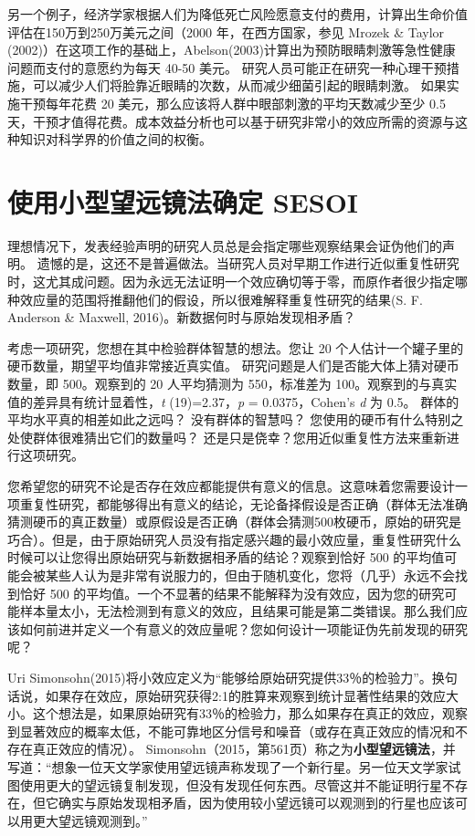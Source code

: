 \documentclass[
  letterpaper,
  DIV=11,
  numbers=noendperiod]{scrreprt}
\begin{document}
另一个例子，经济学家根据人们为降低死亡风险愿意支付的费用，计算出生命价值评估在150万到250万美元之间（2000
年，在西方国家，参见 Mrozek \& Taylor
(2002)）在这项工作的基础上，Abelson(2003)计算出为预防眼睛刺激等急性健康问题而支付的意愿约为每天
40-50 美元。
研究人员可能正在研究一种心理干预措施，可以减少人们将脸靠近眼睛的次数，从而减少细菌引起的眼睛刺激。
如果实施干预每年花费 20 美元，那么应该将人群中眼部刺激的平均天数减少至少
0.5
天，干预才值得花费。成本效益分析也可以基于研究非常小的效应所需的资源与这种知识对科学界的价值之间的权衡。

\hypertarget{ux4f7fux7528ux5c0fux578bux671bux8fdcux955cux6cd5ux786eux5b9a-sesoi}{%
\section{使用小型望远镜法确定
SESOI}\label{ux4f7fux7528ux5c0fux578bux671bux8fdcux955cux6cd5ux786eux5b9a-sesoi}}

理想情况下，发表经验声明的研究人员总是会指定哪些观察结果会证伪他们的声明。
遗憾的是，这还不是普遍做法。当研究人员对早期工作进行近似重复性研究时，这尤其成问题。因为永远无法证明一个效应确切等于零，而原作者很少指定哪种效应量的范围将推翻他们的假设，所以很难解释重复性研究的结果(S.
F. Anderson \& Maxwell, 2016)。新数据何时与原始发现相矛盾？

考虑一项研究，您想在其中检验群体智慧的想法。您让 20
个人估计一个罐子里的硬币数量，期望平均值非常接近真实值。
研究问题是人们是否能大体上猜对硬币数量，即 500。观察到的 20 人平均猜测为
550，标准差为 100。观察到的与真实值的差异具有统计显着性，\emph{t}
(19)=2.37，\emph{p} = 0.0375，Cohen's \emph{d} 为 0.5。
群体的平均水平真的相差如此之远吗？ 没有群体的智慧吗？
您使用的硬币有什么特别之处使群体很难猜出它们的数量吗？
还是只是侥幸？您用近似重复性方法来重新进行这项研究。

您希望您的研究不论是否存在效应都能提供有意义的信息。这意味着您需要设计一项重复性研究，都能够得出有意义的结论，无论备择假设是否正确（群体无法准确猜测硬币的真正数量）或原假设是否正确（群体会猜测500枚硬币，原始的研究是巧合）。但是，由于原始研究人员没有指定感兴趣的最小效应量，重复性研究什么时候可以让您得出原始研究与新数据相矛盾的结论？观察到恰好
500
的平均值可能会被某些人认为是非常有说服力的，但由于随机变化，您将（几乎）永远不会找到恰好
500
的平均值。一个不显著的结果不能解释为没有效应，因为您的研究可能样本量太小，无法检测到有意义的效应，且结果可能是第二类错误。那么我们应该如何前进并定义一个有意义的效应量呢？您如何设计一项能证伪先前发现的研究呢？

Uri
Simonsohn(2015)将小效应定义为``能够给原始研究提供33％的检验力''。换句话说，如果存在效应，原始研究获得2:1的胜算来观察到统计显著性结果的效应大小。这个想法是，如果原始研究有33％的检验力，那么如果存在真正的效应，观察到显著效应的概率太低，不能可靠地区分信号和噪音（或存在真正效应的情况和不存在真正效应的情况）。
Simonsohn（2015，第561页）称之为\textbf{小型望远镜法}，并写道：``想象一位天文学家使用望远镜声称发现了一个新行星。另一位天文学家试图使用更大的望远镜复制发现，但没有发现任何东西。尽管这并不能证明行星不存在，但它确实与原始发现相矛盾，因为使用较小望远镜可以观测到的行星也应该可以用更大望远镜观测到。''
\end{document}

